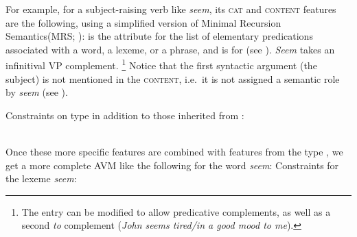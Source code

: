 \documentclass[output=paper
	        ,collection
	        ,collectionchapter
 	        ,biblatex
                ,babelshorthands
                ,newtxmath
                ,draftmode
                ,colorlinks, citecolor=brown
]{langscibook}
\begin{document}
For example, for a subject-raising verb like \emph{seem}, its \textsc{cat} and \textsc{content}
features are the following, using a simplified version of Minimal Recursion Semantics\indexmrs (MRS; \citealp{CFPS2005a}):  is the
attribute for the list of elementary predications associated with a word, a lexeme, or a phrase, and
 is for  (see ). 
\emph{Seem} takes an infinitival VP complement.%
%
\footnote{The entry can be modified to allow predicative complements, as well as a second \emph{to} complement (\emph{John seems tired/in a good mood to me}).}
%
Notice that the first syntactic argument (the subject) is not mentioned in the
  \textsc{content}, i.e.\ it is not assigned a semantic role by \emph{seem} (see
).

\eas
Constraints on type  in addition to those inherited from :\label{ex:prop23}\\
 \impl\\
\zs

\noindent
Once these more specific features are combined with features from the type , we get a
more complete AVM like the following for the word \emph{seem}:
\ea\label{ex:prop24}
Constraints for the lexeme \emph{seem}:\\
\z
\end{document}
